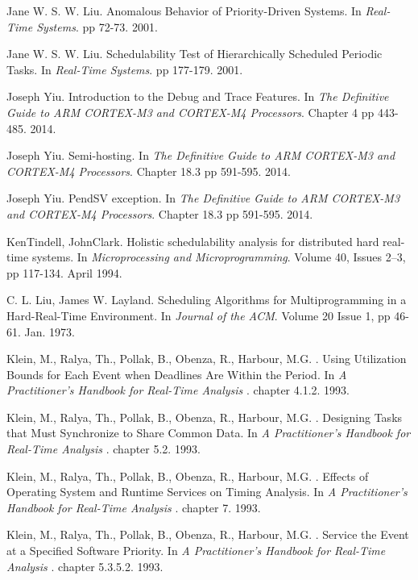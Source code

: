 \documentclass{article}
\begin{document}
\begin{thebibliography}{1}
Jane W. S. W. Liu.
\newblock Anomalous Behavior of Priority-Driven Systems.
\newblock In {\em Real-Time Systems}. pp 72-73. 2001.

Jane W. S. W. Liu.
\newblock Schedulability Test of Hierarchically Scheduled Periodic Tasks.
\newblock In {\em Real-Time Systems}. pp 177-179. 2001.

Joseph Yiu.
\newblock Introduction to the Debug and Trace Features.
\newblock In {\em The Definitive Guide to ARM CORTEX-M3 and CORTEX-M4 Processors}. Chapter 4 pp 443-485. 2014.

Joseph Yiu.
\newblock Semi-hosting.
\newblock In {\em The Definitive Guide to ARM CORTEX-M3 and CORTEX-M4 Processors}. Chapter 18.3 pp 591-595. 2014.

Joseph Yiu.
\newblock PendSV exception.
\newblock In {\em The Definitive Guide to ARM CORTEX-M3 and CORTEX-M4 Processors}. Chapter 18.3 pp 591-595. 2014.

KenTindell, JohnClark.
\newblock Holistic schedulability analysis for distributed hard real-time systems.
\newblock In {\em Microprocessing and Microprogramming}. Volume 40, Issues 2–3, pp 117-134. April 1994.

C. L. Liu, James W. Layland.
\newblock Scheduling Algorithms for Multiprogramming in a Hard-Real-Time Environment.
\newblock In {\em Journal of the ACM}. Volume 20 Issue 1, pp 46-61. Jan. 1973.

Klein, M., Ralya, Th., Pollak, B., Obenza, R., Harbour, M.G. .
\newblock Using Utilization Bounds for Each Event when Deadlines Are Within the Period.
\newblock In {\em A Practitioner’s Handbook for Real-Time Analysis
}. chapter 4.1.2. 1993.

Klein, M., Ralya, Th., Pollak, B., Obenza, R., Harbour, M.G. .
\newblock Designing Tasks that Must Synchronize to Share Common Data.
\newblock In {\em A Practitioner’s Handbook for Real-Time Analysis
}. chapter 5.2. 1993.

Klein, M., Ralya, Th., Pollak, B., Obenza, R., Harbour, M.G. .
\newblock Effects of Operating System and Runtime Services on Timing Analysis.
\newblock In {\em A Practitioner’s Handbook for Real-Time Analysis
}. chapter 7. 1993.

Klein, M., Ralya, Th., Pollak, B., Obenza, R., Harbour, M.G. .
\newblock Service the Event at a Specified Software Priority.
\newblock In {\em A Practitioner’s Handbook for Real-Time Analysis
}. chapter 5.3.5.2. 1993.


\end{thebibliography}
\end{document}
